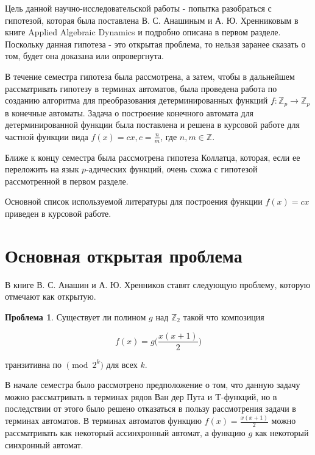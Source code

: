 \documentclass[och, master]{SCWorks}
\author{Sharov Alex}
\theoremstyle{plain}
\theoremstyle{plain}
\theoremstyle{plain}
\theoremstyle{definition}
\newtheorem{problem}{Проблема}
\begin{document}
%
\setcounter{tocdepth}{2}

\tableofcontents

	

\intro


Цель данной научно-исследовательской работы - попытка разобраться с гипотезой, которая была поставлена В. С. Анашиным и А. Ю. Хренниковым в книге Applied Algebraic Dynamics\cite{bib:dynamic:anashin} и подробно описана в первом разделе. Поскольку данная гипотеза - это открытая проблема, то нельзя заранее сказать о том, будет она доказана или опровергнута.

В течение семестра гипотеза была рассмотрена, а затем, чтобы в дальнейшем рассматривать гипотезу в терминах автоматов, была проведена работа по созданию алгоритма для преобразования детерминированных функций $f: \mathbb Z_p \rightarrow \mathbb Z_p$ в конечные автоматы. Задача о построение конечного автомата для детерминированной функции была поставлена и решена в курсовой работе для частной функции вида $f(x)=cx, c=\frac{n}{m}$, где $n,m \in \mathbb Z$.

Ближе к концу семестра была рассмотрена гипотеза Коллатца, которая, если ее переложить на язык $p$-адических функций, очень схожа с гипотезой рассмотренной в первом разделе.

Основной список используемой литературы для построения функции $f(x)=cx$ приведен в курсовой работе.

\section{Основная открытая проблема}

В книге \cite{bib:dynamic:anashin} В. С. Анашин и А. Ю. Хренников ставят следующую проблему, которую отмечают как открытую.


\begin{problem}\label{problem:general}
Существует ли полином $g$ над $\mathbb Z_2$ такой что композиция 

\begin{equation} \label{problem:1}
f(x)=g\bigg(\frac{x(x+1)}{2}\bigg)	
\end{equation}

\noindent транзитивна по $\pmod {2^{k}}$ для всех $k$.
\end{problem}

В начале семестра было рассмотрено предположение о том, что данную задачу можно рассматривать в терминах рядов Ван дер Пута и T-функций, но в последствии от этого было решено отказаться в пользу рассмотрения задачи в терминах автоматов. В терминах автоматов функцию $f(x)=\frac{x(x+1)}{2}$ можно рассматривать как некоторый ассинхронный автомат, а функцию $g$ как некоторый синхронный автомат.
\end{document}
